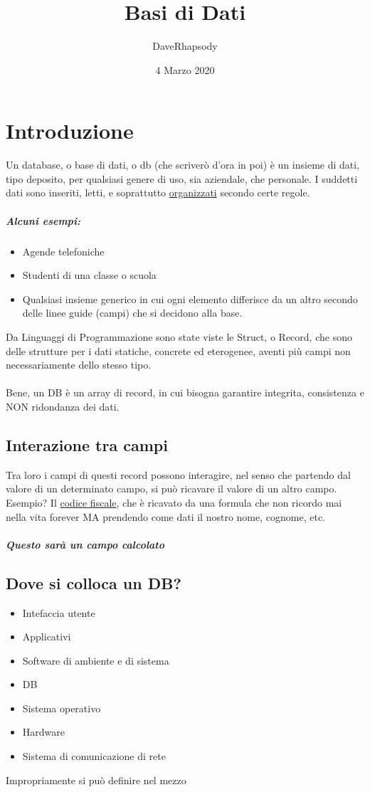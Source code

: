 \documentclass[12pt, a4paper, openany, twoside]{book}
\begin{document}
\selectfont
\pagestyle{plain}
\author{DaveRhapsody}
\title {Basi di Dati}
\date {4 Marzo 2020}
\maketitle
\tableofcontents
\chapter*{Introduzione}
Un database, o base di dati, o db (che scriverò d'ora in poi) è un insieme di 
dati, tipo deposito, per qualsiasi genere di uso, sia aziendale, che personale.
I suddetti dati sono inseriti, letti, e soprattutto \underline{organizzati} 
secondo certe regole.
\paragraph{Alcuni esempi: }
\begin{itemize}
	\item Agende telefoniche
	\item Studenti di una classe o scuola
	\item Qualsiasi insieme generico in cui ogni elemento differisce da un altro
	secondo delle linee guide (campi) che si decidono alla base.
\end{itemize}
Da Linguaggi di Programmazione sono state viste le Struct, o Record, che sono
delle strutture per i dati statiche, concrete ed eterogenee, aventi più campi
non necessariamente dello stesso tipo. \\ \\
Bene, un DB è un array di record, in cui bisogna garantire integrita, consistenza
e NON ridondanza dei dati.
\section{Interazione tra campi}
Tra loro i campi di questi record possono interagire, nel senso che partendo dal
valore di un determinato campo, si può ricavare il valore di un altro campo.
Esempio? Il \underline{codice fiscale}, che è ricavato da una formula che non 
ricordo mai nella vita forever MA prendendo come dati il nostro nome, cognome, 
etc.
\paragraph{Questo sarà un campo calcolato}
\section{Dove si colloca un DB?}
\begin{itemize}
	\item Intefaccia utente
	\item Applicativi
	\item Software di ambiente e di sistema
	\item DB
	\item Sistema operativo
	\item Hardware
	\item Sistema di comunicazione di rete
\end{itemize}
Impropriamente si può definire nel mezzo
\end{document}
